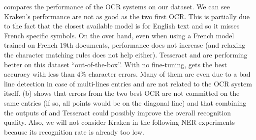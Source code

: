 %
 compares the performance of the OCR systems on our dataset. We can see Kraken's performance are
not as good as the two first OCR. This is partially due to the fact that the closest available model is for English text
and so it misses French specific symbols. On the over hand, even when using a French model trained on French 19th
documents, performance does not increase (and relaxing the character matching rules does not help either). Tesseract and
\peroocr are performing better on this dataset ``out-of-the-box''. With no fine-tuning, \peroocr gets the best accuracy
with less than 4\% character errors. Many of them are even due to a bad line detection in case of multi-lines entries
and are not related to the OCR system itself.  (b) shows that errors from the two best OCR are not
committed on the same entries (if so, all points would be on the diagonal line) and that combining the outputs of
\peroocr and Tesseract could possibly improve the overall recognition quality. 
Also, we will not consider Kraken in the following NER experiments because its recognition rate is already too low.

